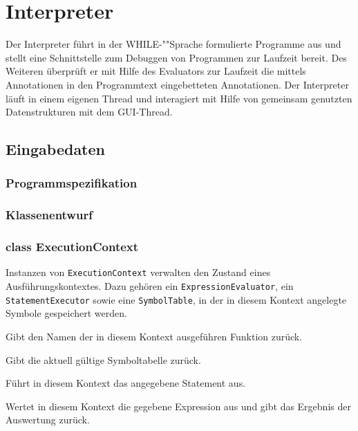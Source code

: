 \section{Interpreter}

Der Interpreter führt in der WHILE-""Sprache formulierte Programme aus und stellt eine Schnittstelle zum Debuggen von Programmen zur Laufzeit bereit. Des Weiteren überprüft er mit Hilfe des Evaluators zur Laufzeit die mittels Annotationen in den Programmtext eingebetteten Annotationen. Der Interpreter läuft in einem eigenen Thread und interagiert mit Hilfe von gemeinsam genutzten Datenstrukturen mit dem GUI-Thread.

\subsection{Eingabedaten}

\subsubsection{Programmspezifikation}


\subsubsection{Klassenentwurf}

\subsubsection{class ExecutionContext}
Instanzen von \texttt{ExecutionContext} verwalten den Zustand eines Ausführungskontextes. Dazu gehören ein \texttt{ExpressionEvaluator}, ein \texttt{StatementExecutor} sowie eine \texttt{SymbolTable}, in der in diesem Kontext angelegte Symbole gespeichert werden.


\begin{description}
    Gibt den Namen der in diesem Kontext ausgeführen Funktion zurück.

    Gibt die aktuell gültige Symboltabelle zurück.

    Führt in diesem Kontext das angegebene Statement aus.

    Wertet in diesem Kontext die gegebene Expression aus und gibt das Ergebnis der Auswertung zurück.
\end{description}


